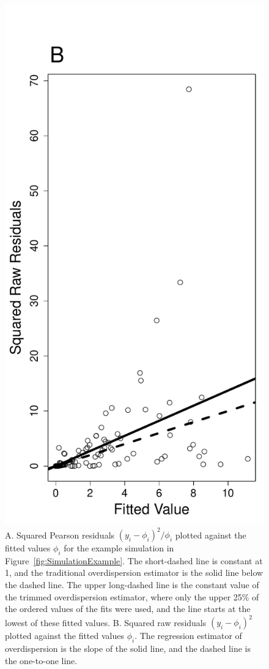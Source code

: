 \documentclass[12pt, titlepage]{article}\usepackage[]{graphicx}\usepackage[]{color}
\makeatletter
\def\maxwidth{ %
  \ifdim\Gin@nat@width>\linewidth
    \linewidth
  \else
    \Gin@nat@width
  \fi
}
\makeatother
\begin{document}
\begin{figure}[H]
\begin{center}
		\includegraphics[width = .40\maxwidth]{rawResids4Overdisp}
		\end{center}
		\caption{A. Squared Pearson residuals $(y_i-\phi_i)^2/\phi_i$ plotted against the fitted values $\phi_i$ for the example simulation in Figure~\ref{fig:SimulationExample}. The short-dashed line is constant at 1, and the traditional overdispersion estimator is the solid line below the dashed line.  The upper long-dashed line is the constant value of the trimmed overdispersion estimator, where only the upper 25\% of the ordered values of the fits were used, and the line starts at the lowest of these fitted values.  B. Squared raw residuals $(y_i-\phi_i)^2$ plotted against the fitted values $\phi_i$. The regression estimator of overdispersion is the slope of the solid line, and the dashed line is the one-to-one line.  \label{fig:residDisp}}
		\end{figure}
\end{document}

